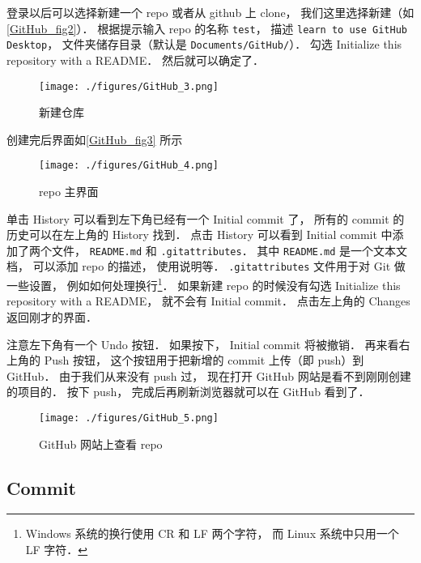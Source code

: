 登录以后可以选择新建一个 repo 或者从 github 上 clone， 我们这里选择新建（如\autoref{GitHub_fig2}）． 根据提示输入 repo 的名称 \verb|test|， 描述 \verb|learn to use GitHub Desktop|， 文件夹储存目录（默认是 \verb|Documents/GitHub/|）． 勾选 Initialize this repository with a README． 然后就可以确定了．

\begin{figure}[ht]
\centering
\texttt{[image: ./figures/GitHub\_3.png]}
\caption{新建仓库} \label{GitHub_fig2}
\end{figure}

创建完后界面如\autoref{GitHub_fig3} 所示
\begin{figure}[ht]
\centering
\texttt{[image: ./figures/GitHub\_4.png]}
\caption{repo 主界面} \label{GitHub_fig3}
\end{figure}

单击 History 可以看到左下角已经有一个 Initial commit 了， 所有的 commit 的历史可以在左上角的 History 找到． 点击 History 可以看到 Initial commit 中添加了两个文件， \verb|README.md| 和 \verb|.gitattributes|． 其中 \verb|README.md| 是一个文本文档， 可以添加 repo 的描述， 使用说明等． \verb|.gitattributes| 文件用于对 Git 做一些设置， 例如如何处理换行\footnote{Windows 系统的换行使用 CR 和 LF 两个字符， 而 Linux 系统中只用一个 LF 字符．}． 如果新建 repo 的时候没有勾选 Initialize this repository with a README， 就不会有 Initial commit． 点击左上角的 Changes 返回刚才的界面．

注意左下角有一个 Undo 按钮． 如果按下， Initial commit 将被撤销． 再来看右上角的 Push 按钮， 这个按钮用于把新增的 commit 上传（即 push）到 GitHub． 由于我们从来没有 push 过， 现在打开 GitHub 网站是看不到刚刚创建的项目的． 按下 push， 完成后再刷新浏览器就可以在 GitHub 看到了．
\begin{figure}[ht]
\centering
\texttt{[image: ./figures/GitHub\_5.png]}
\caption{GitHub 网站上查看 repo} \label{GitHub_fig5}
\end{figure}

\subsection{Commit}
